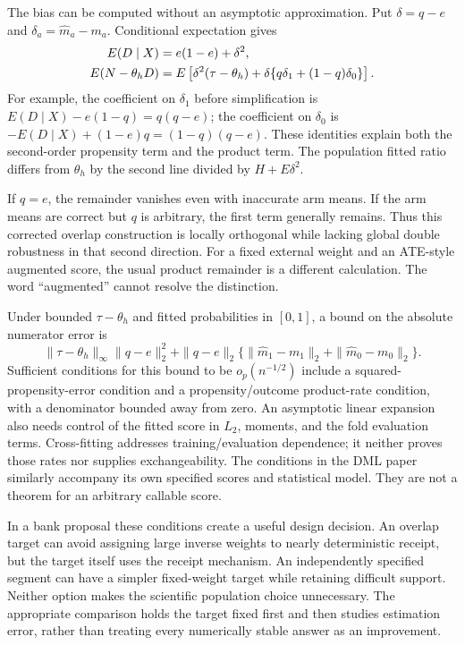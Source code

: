 The bias can be computed without an asymptotic approximation. Put
$\delta=q-e$ and $\delta_a=\widehat m_a-m_a$. Conditional expectation gives
\begin{align}
 E(D\mid X)&=e(1-e)+\delta^2,\notag\\
 E(N-\theta_hD)&=
 E\left[\delta^2(\tau-\theta_h)
       +\delta\{q\delta_1+(1-q)\delta_0\}\right].
 \label{exec17:s4-overlap-remainder}
\end{align}
For example, the coefficient on $\delta_1$ before simplification is
$E(D\mid X)-e(1-q)=q(q-e)$; the coefficient on $\delta_0$ is
$-E(D\mid X)+(1-e)q=(1-q)(q-e)$. These identities explain both the
second-order propensity term and the product term. The population fitted
ratio differs from $\theta_h$ by the second line divided by
$H+E\delta^2$.~\citep{exec17_s4_math}

If $q=e$, the remainder vanishes even with inaccurate arm means. If the arm
means are correct but $q$ is arbitrary, the first term generally remains.
Thus this corrected overlap construction is locally orthogonal while lacking
global double robustness in that second direction. For a fixed external
weight and an ATE-style augmented score, the usual product remainder is a
different calculation. The word ``augmented'' cannot resolve the distinction.

Under bounded $\tau-\theta_h$ and fitted probabilities in $[0,1]$, a bound
on the absolute numerator error is
\[
 \|\tau-\theta_h\|_\infty\|q-e\|_2^2+
 \|q-e\|_2\{\|\widehat m_1-m_1\|_2+
                          \|\widehat m_0-m_0\|_2\}.
\]
Sufficient conditions for this bound to be $o_p(n^{-1/2})$ include a
squared-propensity-error condition and a propensity/outcome product-rate
condition, with a denominator bounded away from zero. An asymptotic linear
expansion also needs control of the fitted score in $L_2$, moments, and the
fold evaluation terms. Cross-fitting addresses training/evaluation dependence;
it neither proves those rates nor supplies exchangeability. The conditions in
the DML paper similarly accompany its own specified scores and statistical
model. They are not a theorem for an arbitrary callable score.~\citep{dml2018,doubleml2022}

In a bank proposal these conditions create a useful design decision. An
overlap target can avoid assigning large inverse weights to nearly deterministic
receipt, but the target itself uses the receipt mechanism. An independently
specified segment can have a simpler fixed-weight target while retaining
difficult support. Neither option makes the scientific population choice
unnecessary. The appropriate comparison holds the target fixed first and
then studies estimation error, rather than treating every numerically stable
answer as an improvement.

